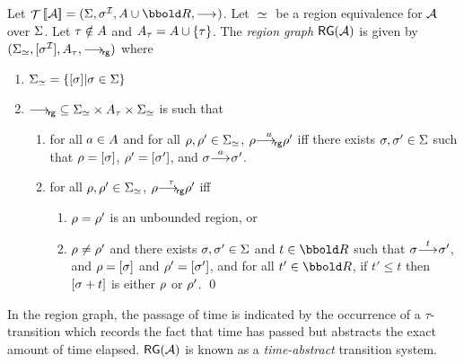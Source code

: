 {\begin{definition}
Let $\TSys{\AA} = (\States,\Init,\Actions \cup \Time,\TRel)$. Let
${}\simeq{}$ be a region equivalence for $\AA$ over $\Sigma$. Let
$\tau \notin A$ and $A_\tau = A \cup \{\tau\}$.
The \emph{region graph} $\RG(\AA)$ is given by 
$(\States_\req, \region{\Init}, \Actions_\tau, \goesRG{})$ where
\begin{enumerate}
\item $\Sigma_\simeq = \{ [\sigma] | \sigma \in \Sigma\}$
\item ${{\mathrel{{\stackrel{}{\longrightarrow_{\mathrm{\!{\sf rg}}}}}}}} \subseteq \Sigma_\simeq \times A_\tau \times 
\Sigma_\simeq$ is such that
\begin{enumerate}
\item for all $a \in A$ and for all $\rho, \rho' \in \Sigma_\simeq$,
$\rho {{\mathrel{{\stackrel{a}{\longrightarrow_{\mathrm{\!{\sf rg}}}}}}}} \rho'$ iff there exists $\sigma, \sigma' \in \Sigma$ such that
$\rho = [\sigma]$, $\rho' = [\sigma']$, and $\sigma {\mathrel{{\stackrel{a}{\longrightarrow_{\mathrm{{}}}}}}} \sigma'$.
\item for all $\rho, \rho' \in \Sigma_\simeq$, $\rho {{\mathrel{{\stackrel{\tau}{\longrightarrow_{\mathrm{\!{\sf rg}}}}}}}} \rho'$ iff
\begin{enumerate}
\item $\rho = \rho'$ is an unbounded region, or
\item $\rho \neq \rho'$ and there exists $\sigma, \sigma' \in \Sigma$ and 
$t \in \Time$ such that $\sigma {\mathrel{{\stackrel{t}{\longrightarrow_{\mathrm{{}}}}}}} \sigma'$, and $\rho = [\sigma]$
and $\rho' = [\sigma']$, and for all $t' \in \Time$, if $t' \leq t$
then $[\sigma + t]$ is either $\rho$ or $\rho'$. 
\qed
\end{enumerate}
\end{enumerate}
\end{enumerate} 
\end{definition}
In the region graph, the passage of time is indicated by the occurrence of
a $\tau$-transition which records the fact that time has passed but abstracts
the exact amount of time elapsed. $\RG(\AA)$ is known as
a \emph{time-abstract} transition system. 

}
